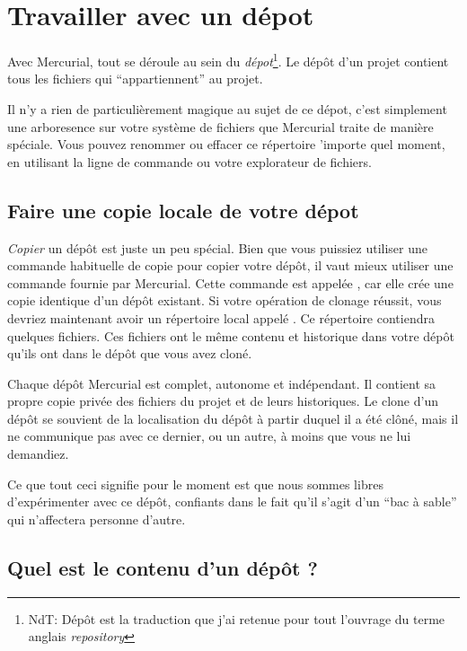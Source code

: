 \section{Travailler avec un dépot}

Avec Mercurial, tout se déroule au sein du \emph{dépot}\footnote{NdT: Dépôt est
la traduction que j'ai retenue pour tout l'ouvrage du terme anglais \textit{repository}}.
Le dépôt d'un projet contient tous les fichiers qui ``appartiennent'' au projet.

Il n'y a rien de particulièrement magique au sujet de ce dépot, c'est
simplement une arboresence sur votre système de fichiers que Mercurial
traite de manière spéciale. Vous pouvez renommer ou effacer ce répertoire
'importe quel moment, en utilisant la ligne de commande ou votre
explorateur de fichiers.

\subsection{Faire une copie locale de votre dépot}

\emph{Copier} un dépôt est juste un peu spécial. Bien que vous 
puissiez utiliser une commande habituelle de copie pour copier
votre dépôt, il vaut mieux utiliser une commande fournie par
Mercurial. Cette commande est appelée , car elle
crée une copie identique d'un dépôt existant.
Si votre opération de clonage réussit, vous devriez maintenant
avoir un répertoire local appelé . Ce répertoire
contiendra quelques fichiers.
Ces fichiers ont le même contenu et historique dans votre dépôt
qu'ils ont dans le dépôt que vous avez cloné.

Chaque dépôt Mercurial est complet, autonome et indépendant. Il
contient sa propre copie privée des fichiers du projet et de leurs
historiques. Le clone d'un dépôt se souvient de la localisation du
dépôt à partir duquel il a été clôné, mais il ne communique pas avec
ce dernier, ou un autre, à moins que vous ne lui demandiez.

Ce que tout ceci signifie pour le moment est que nous sommes libres
d'expérimenter avec ce dépôt, confiants dans le fait qu'il s'agit d'un
``bac à sable'' qui n'affectera personne d'autre.

\subsection{Quel est le contenu d'un dépôt ?}

